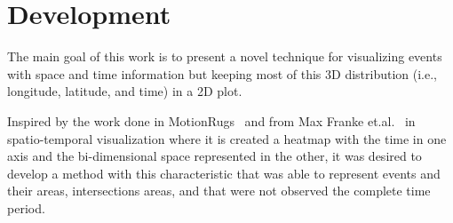 \section{Development}

The main goal of this work is to present a novel technique for visualizing events with space and time information but keeping most of this 3D distribution (i.e., longitude, latitude, and time) in a 2D plot.
%

Inspired by the work done in MotionRugs~\cite{Buchmuller2019} and from Max Franke et.al.~\cite{franke2021visual} in spatio-temporal visualization where it is created a heatmap with the time in one axis and the bi-dimensional space represented in the other, 
%
it was desired to develop a method with this characteristic that was able to represent events and their areas, intersections areas, and that were not observed the complete time period.
